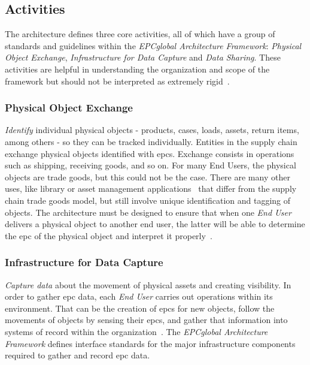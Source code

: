 \subsection{Activities} \label{sec:activities}

The architecture defines three core activities, all of which have a group of standards and guidelines within the \emph{EPCglobal Architecture Framework}: \emph{Physical Object Exchange}, \emph{Infrastructure for Data Capture} and \emph{Data Sharing}.
These activities are helpful in understanding the organization and scope of the framework but should not be interpreted as extremely rigid~\cite{GS1EPCglobalArchitecture}.

\subsubsection{Physical Object Exchange} 

\emph{Identify} individual physical objects - products, cases, loads, assets, return items, among others - so they can be tracked individually.
Entities in the supply chain exchange physical objects identified with \acp{epc}.
Exchange consists in operations such as shipping, receiving goods, and so on.
For many End Users, the physical objects are trade goods, but this could not be the case.
There are many other uses, like library or asset management applications~\cite{dong-yingliDesignInternetThings2016} that differ from the supply chain trade goods model, but still involve unique identification and tagging of objects. 
The architecture must be designed to ensure that when one \textit{End User} delivers a physical object to another end user, the latter will be able to determine the \ac{epc} of the physical object and interpret it properly~\cite{GS1EPCglobalArchitecture}.

\subsubsection{Infrastructure for Data Capture} 

\emph{Capture data} about the movement of physical assets and creating visibility.
In order to gather \ac{epc} data, each \emph{End User} carries out operations within its environment. That can be the creation of \ac{epc}s for new objects, follow the movements of objects by sensing their \ac{epc}s, and gather that information into systems of record within the organization~\cite{GS1EPCglobalArchitecture}. The \emph{EPCglobal Architecture Framework} defines interface standards for the major infrastructure components required to gather and record \ac{epc} data.

